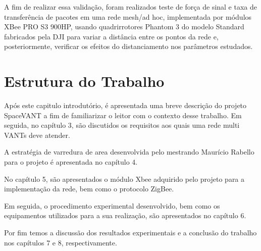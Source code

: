 A fim de realizar essa validação, foram realizados teste de força de sinal e taxa de transferência de pacotes em uma rede mesh/ad hoc, implementada por módulos XBee PRO S3 900HP, usando quadrirrotores Phantom 3 do modelo Standard fabricados pela DJI para variar a distância entre os pontos da rede e, posteriormente, verificar os efeitos do distanciamento nos parâmetros estudados.

\section{Estrutura do Trabalho}

Após este capitulo introdutório, é apresentada uma breve descrição do projeto SpaceVANT a fim de familiarizar o leitor com o contexto desse trabalho. Em seguida, no capítulo 3, são discutidos os requisitos aos quais uma rede multi VANTs deve atender. 

A estratégia de varredura de area desenvolvida pelo mestrando Maurício Rabello para o projeto é apresentada no capítulo 4. 

No capítulo 5, são apresentados o módulo Xbee adquirido pelo projeto para a implementação da rede, bem como o protocolo ZigBee. 

Em seguida, o procedimento experimental desenvolvido, bem como os equipamentos utilizados para a sua realização, são apresentados no capítulo 6.

Por fim temos a discussão dos resultados experimentais e a conclusão do trabalho nos capítulos 7 e 8, respectivamente.  